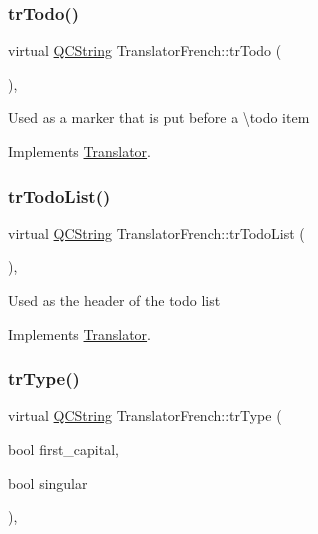 \subsubsection{\texorpdfstring{trTodo()}{trTodo()}}
{\footnotesize\ttfamily virtual \mbox{\hyperlink{class_q_c_string}{Q\+C\+String}} Translator\+French\+::tr\+Todo (\begin{DoxyParamCaption}{ }\end{DoxyParamCaption})\hspace{0.3cm}{\ttfamily [inline]}, {\ttfamily [virtual]}}

Used as a marker that is put before a \textbackslash{}todo item 

Implements \mbox{\hyperlink{class_translator}{Translator}}.

\mbox{\label{class_translator_french_a31405726b3d9a20d083cfbeb91b7adca}} 
\subsubsection{\texorpdfstring{trTodoList()}{trTodoList()}}
{\footnotesize\ttfamily virtual \mbox{\hyperlink{class_q_c_string}{Q\+C\+String}} Translator\+French\+::tr\+Todo\+List (\begin{DoxyParamCaption}{ }\end{DoxyParamCaption})\hspace{0.3cm}{\ttfamily [inline]}, {\ttfamily [virtual]}}

Used as the header of the todo list 

Implements \mbox{\hyperlink{class_translator}{Translator}}.

\mbox{\label{class_translator_french_a6c33c20e51c6e84eb9464b5742597f4c}} 
\subsubsection{\texorpdfstring{trType()}{trType()}}
{\footnotesize\ttfamily virtual \mbox{\hyperlink{class_q_c_string}{Q\+C\+String}} Translator\+French\+::tr\+Type (\begin{DoxyParamCaption}\item[{bool}]{first\+\_\+capital,  }\item[{bool}]{singular }\end{DoxyParamCaption})\hspace{0.3cm}{\ttfamily [inline]}, {\ttfamily [virtual]}}

